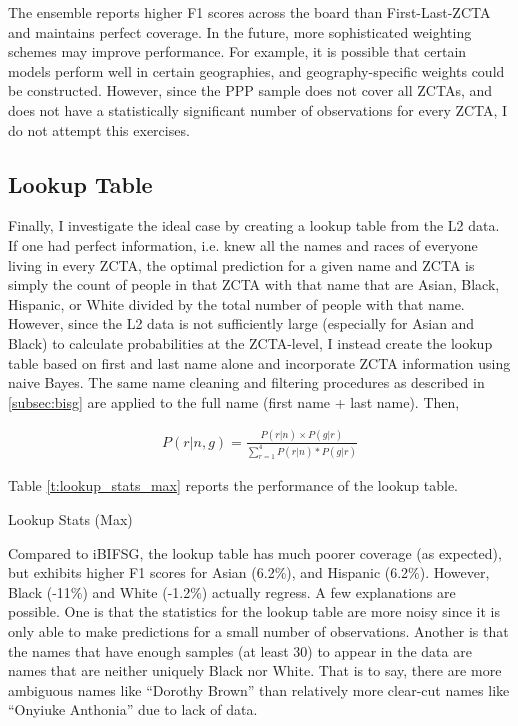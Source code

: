 \documentclass[12pt]{article}
\begin{document}
The ensemble reports higher F1 scores across the board than First-Last-ZCTA and maintains perfect coverage. In the future, more sophisticated weighting schemes may improve performance. For example, it is possible that certain models perform well in certain geographies, and geography-specific weights could be constructed. However, since the PPP sample does not cover all ZCTAs, and does not have a statistically significant number of observations for every ZCTA, I do not attempt this exercises.


\subsection{Lookup Table}

Finally, I investigate the ideal case by creating a lookup table from the L2 data. If one had perfect information, i.e. knew all the names and races of everyone living in every ZCTA, the optimal prediction for a given name and ZCTA is simply the count of people in that ZCTA with that name that are Asian, Black, Hispanic, or White divided by the total number of people with that name. However, since the L2 data is not sufficiently large (especially for Asian and Black) to calculate probabilities at the ZCTA-level, I instead create the lookup table based on first and last name alone and incorporate ZCTA information using naive Bayes. The same name cleaning and filtering procedures as described in \ref{subsec:bisg} are applied to the full name (first name + last name). Then,

\begin{align*}
    P(r | n, g) = \frac{P(r | n) \times P(g | r)}{\sum_{r=1}^{4} P(r | n) * P(g | r)}
\end{align*}

Table \ref{t:lookup_stats_max} reports the performance of the lookup table.

\begin{table}[H]
    \caption{Lookup Stats (Max)}
    \label{t:lookup_stats_max}
    \centering
    
\end{table}

Compared to iBIFSG, the lookup table has much poorer coverage (as expected), but exhibits higher F1 scores for Asian (6.2\%), and Hispanic (6.2\%). However, Black (-11\%) and White (-1.2\%) actually regress. A few explanations are possible. One is that the statistics for the lookup table are more noisy since it is only able to make predictions for a small number of observations. Another is that the names that have enough samples (at least 30) to appear in the data are names that are neither uniquely Black nor White. That is to say, there are more ambiguous names like ``Dorothy Brown'' than relatively more clear-cut names like ``Onyiuke Anthonia'' due to lack of data.
\end{document}
